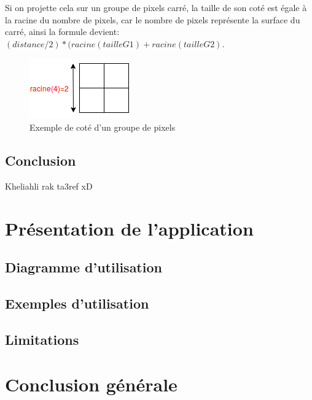 \documentclass[12pt]{report}
\begin{document}
Si on projette cela sur un groupe de pixels carré, la taille de son coté est égale à la racine du nombre de pixels, car le nombre de pixels représente la surface du carré, ainsi la formule devient: \textbf{$(distance/2)*(racine(tailleG1)+racine(tailleG2)$}.
\begin{figure}[H]
	\centering
	\includegraphics[scale=0.75]{imgs/GroupeSide.png}
	\caption{Exemple de coté d'un groupe de pixels}
	\label{fig:GroupeSide}
\end{figure}
\section{Conclusion}
Kheliahli rak ta3ref xD 


\chapter{Présentation de l'application}

\section{Diagramme d'utilisation}
\section{Exemples d'utilisation}
\section{Limitations}

\chapter{Conclusion générale}
\paragraph{}
\end{document}
